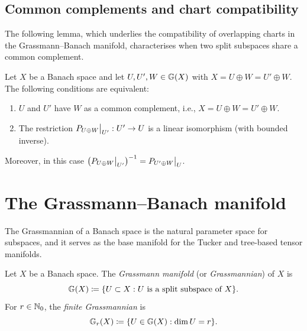 \subsection*{Common complements and chart compatibility}

The following lemma, which underlies the compatibility of overlapping
charts in the Grassmann--Banach manifold, characterises when two split
subspaces share a common complement.

\begin{lemma}
\label{lem:common_complement}
Let $X$ be a Banach space and let $U, U', W \in \mathbb{G}(X)$ with
$X = U \oplus W = U' \oplus W$. The following conditions are equivalent:
\begin{enumerate}
\item[\textup{(a)}] $U$ and $U'$ have $W$ as a common complement, i.e.,
    $X = U \oplus W = U' \oplus W$.
\item[\textup{(b)}] The restriction $P_{U \oplus W}\big|_{U'} : U' \to U$
    is a linear isomorphism (with bounded inverse).
\end{enumerate}
Moreover, in this case
$\bigl(P_{U \oplus W}\big|_{U'}\bigr)^{-1} = P_{U' \oplus W}\big|_U$.
\end{lemma}

\section{The Grassmann--Banach manifold}
\label{sec:banach:grassmann}

The Grassmannian of a Banach space is the natural parameter space for
subspaces, and it serves as the base manifold for the Tucker and
tree-based tensor manifolds.

\begin{definition}
\label{def:grassmannian}
Let $X$ be a Banach space. The \emph{Grassmann manifold} (or
\emph{Grassmannian}) of $X$ is
\begin{equation*}
    \mathbb{G}(X) \coloneqq \{U \subset X : U \text{ is a split subspace of } X\}.
\end{equation*}
For $r \in \mathbb{N}_0$, the \emph{finite Grassmannian} is
\begin{equation*}
    \mathbb{G}_{r}(X) \coloneqq
    \{U \in \mathbb{G}(X) : \dim U = r\}.
\end{equation*}
\end{definition}

